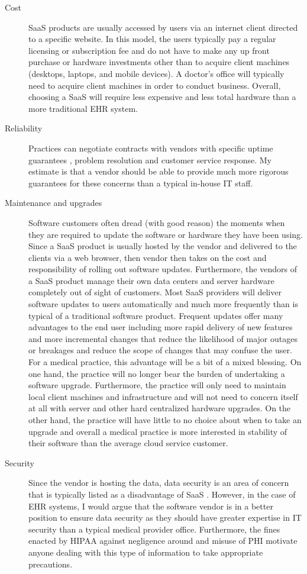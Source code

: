 \documentclass[10pt]{article}
\begin{document}
\begin{description}
\item[Cost]
SaaS products are usually accessed by users via an internet client directed to a specific website.
In this model, the users typically pay a regular licensing or subscription fee and do not have to make any up front purchase or hardware investments other than to acquire client machines (desktops, laptops, and mobile devices). 
A doctor's office will typically need to acquire client machines in order to conduct business. Overall, choosing a SaaS will require less expensive and less total hardware than a more traditional EHR system.

\item[Reliability]
Practices can negotiate contracts with vendors with specific uptime guarantees \cite{wiki-saas}, problem resolution and customer service response.
My estimate is that a vendor should be able to provide much more rigorous guarantees for these concerns than a typical in-house IT staff.

\item[Maintenance and upgrades]
Software customers often dread (with good reason) the moments when they are required to update the software or hardware they have been using.
Since a SaaS product is usually hosted by the vendor and delivered to the clients via a web browser, then vendor then takes on the cost and responsibility of rolling out software updates.
Furthermore, the vendors of a SaaS product manage their own data centers and server hardware completely out of sight of customers.
Most SaaS providers will deliver software updates to users automatically and much more frequently than is typical of a traditional software product.
Frequent updates offer many advantages to the end user including more rapid delivery of new features and more incremental changes that reduce the likelihood of major outages or breakages and reduce the scope of changes that may confuse the user.
For a medical practice, this advantage will be a bit of a mixed blessing.
On one hand, the practice will no longer bear the burden of undertaking a software upgrade.
Furthermore, the practice will only need to maintain local client machines and infrastructure and will not need to concern itself at all with server and other hard centralized hardware upgrades.
On the other hand, the practice will have little to no choice about when to take an upgrade and overall a medical practice is more interested in stability of their software than the average cloud service customer.

\item[Security]
Since the vendor is hosting the data, data security is an area of concern that is typically listed as a disadvantage of SaaS \cite{wiki-saas}.
However, in the case of EHR systems, I would argue that the software vendor is in a better position to ensure data security as they should have greater expertise in IT security than a typical medical provider office.
Furthermore, the fines enacted by HIPAA against negligence around and misuse of PHI motivate anyone dealing with this type of information to take appropriate precautions.

\end{description}
\end{document}
